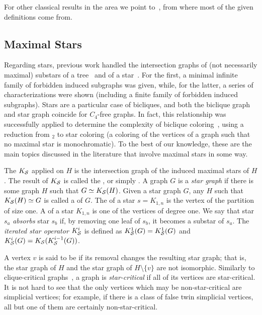 For other classical results in the area we point to~\citep{intersection_graphs}, from where most of the given definitions come from.

\subsection{Maximal Stars}

Regarding stars, previous work handled the intersection graphs of (not necessarily maximal) substars of a tree~\citep{substar_graph} and of a star~\citep{starlike_graph}.
For the first, a minimal infinite family of forbidden induced subgraphs was given, while, for the latter, a series of characterizations were shown (including a finite family of forbidden induced subgraphs).
Stars are a particular case of bicliques, and both the biclique graph and star graph coincide for $C_4$-free graphs.
In fact, this relationship was successfully applied to determine the complexity of biclique coloring~\citep{biclique_coloring_complexity}, using a reduction from $_2$ to star coloring (a coloring of the vertices of a graph such that no maximal star is monochromatic).
To the best of our knowledge, these are the main topics discussed in the literature that involve maximal stars in some way.


The  $K_{\mathcal{S}}$ applied on $H$ is the intersection graph of the induced maximal stars of $H$.
The result of $K_{\mathcal{S}}$ is called the , or simply .
A graph $G$ is a \textit{star graph} if there is some graph $H$ such that $G \simeq K_{\mathcal{S}}(H)$. 
Given a star graph $G$, any $H$ such that $K_{\mathcal{S}}(H) \simeq G$ is called a  of $G$.
The  of a star $s = K_{1,n}$ is the vertex of the partition of size one.
A  of a star $K_{1,n}$ is one of the vertices of degree one.
We say that star $s_a$ \textit{absorbs} star $s_b$ if, by removing one leaf of $s_b$, it becomes a substar of $s_a$.
The \textit{iterated star operator} $K_{\mathcal{S}}^i$ is defined as $K_{\mathcal{S}}^1(G) = K_{\mathcal{S}}^1(G)$ and $K_{\mathcal{S}}^i(G) = K_{\mathcal{S}}(K_{\mathcal{S}}^{i-1}(G))$.

A vertex $v$ is said to be  if its removal changes the resulting star graph; that is, the star graph of $H$ and the star graph of $H \setminus \{v\}$ are not isomorphic.
Similarly to clique-critical graphs~\citep{clique_critical_toft,clique_critical_alcon}, a graph is \textit{star-critical} if all of its vertices are star-critical.
It is not hard to see that the only vertices which may be non-star-critical are simplicial vertices; for example, if there is a class of false twin simplicial vertices, all but one of them are certainly non-star-critical.

